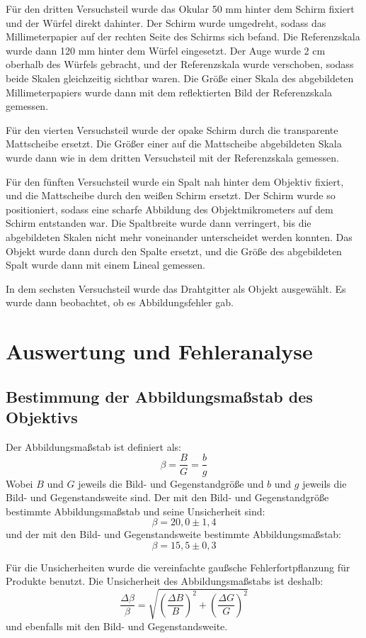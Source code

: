 \documentclass[11pt,a4paper]{article}
\begin{document}
Für den dritten Versuchsteil wurde das Okular 50 mm hinter dem Schirm fixiert und der Würfel direkt dahinter. Der Schirm wurde umgedreht, sodass das Millimeterpapier auf der rechten Seite des Schirms sich befand. Die Referenzskala wurde dann 120 mm hinter dem Würfel eingesetzt. Der Auge wurde 2 cm oberhalb des Würfels gebracht, und der Referenzskala wurde verschoben, sodass beide Skalen gleichzeitig sichtbar waren. Die Größe einer Skala des abgebildeten Millimeterpapiers wurde dann mit dem reflektierten Bild der Referenzskala gemessen. 

Für den vierten Versuchsteil wurde der opake Schirm durch die transparente Mattscheibe ersetzt. Die Größer einer auf die Mattscheibe abgebildeten Skala wurde dann wie in dem dritten Versuchsteil mit der Referenzskala gemessen. 

Für den fünften Versuchsteil wurde ein Spalt nah hinter dem Objektiv fixiert, und die Mattscheibe durch den weißen Schirm ersetzt. Der Schirm wurde so positioniert, sodass eine scharfe Abbildung des Objektmikrometers auf dem Schirm entstanden war. Die Spaltbreite wurde dann verringert, bis die abgebildeten Skalen nicht mehr voneinander unterscheidet werden konnten. Das Objekt wurde dann durch den Spalte ersetzt, und die Größe des abgebildeten Spalt wurde dann mit einem Lineal gemessen. 

In dem sechsten Versuchsteil wurde das Drahtgitter als Objekt ausgewählt. Es wurde dann beobachtet, ob es Abbildungsfehler gab. 


\section{Auswertung und Fehleranalyse}
\subsection{Bestimmung der Abbildungsmaßstab des Objektivs}
Der Abbildungsmaßstab ist definiert als:
$$ \beta = \frac{B}{G} = \frac{b}{g} $$
Wobei $B$ und $G$ jeweils die Bild- und Gegenstandgröße und $b$ und $g$ jeweils die Bild- und Gegenstandsweite sind. Der mit den Bild- und Gegenstandgröße bestimmte Abbildungsmaßstab und seine Unsicherheit sind:
$$ \beta = 20,0 \pm 1,4 $$
und der mit den Bild- und Gegenstandsweite bestimmte Abbildungsmaßstab:
$$ \beta = 15,5 \pm 0,3 $$

Für die Unsicherheiten wurde die vereinfachte gaußsche Fehlerfortpflanzung für Produkte benutzt. Die Unsicherheit des Abbildungsmaßstabs ist deshalb:
$$ \frac{\Delta \beta}{\beta} = \sqrt{\left(\frac{\Delta B}{B}\right)^2+\left(\frac{\Delta G}{G}\right)^2}$$
und ebenfalls mit den Bild- und Gegenstandsweite. 
\end{document}
